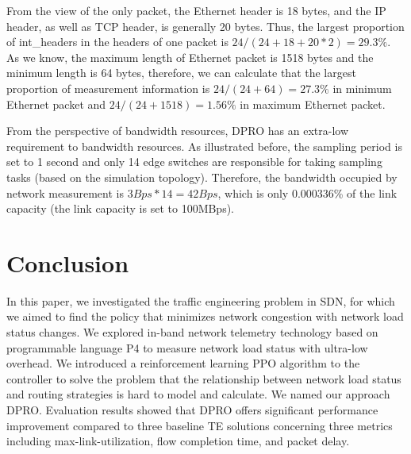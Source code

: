 \documentclass[10pt,conference]{IEEEtran}
\begin{document}
From the view of the only packet, the Ethernet header is 18 bytes, and the IP header, as well as TCP header, is generally 20 bytes. Thus, the largest proportion of int\_headers in the headers of one packet is $24/(24+18+20*2)=29.3\%$. As we know, the maximum length of Ethernet packet is 1518 bytes and the minimum length is 64 bytes, therefore, we can calculate that the largest proportion of measurement information is $24/(24+64)=27.3\%$ in minimum Ethernet packet and $24/(24+1518)=1.56\%$ in maximum Ethernet packet.

From the perspective of bandwidth resources, DPRO has an extra-low requirement to bandwidth resources. As illustrated before, the sampling period is set to 1 second and only 14 edge switches are responsible for taking sampling tasks (based on the simulation topology). Therefore, the bandwidth occupied by network measurement is $3Bps *14=42Bps$, which is only 0.000336\% of the link capacity (the link capacity is set to 100MBps).

\section{Conclusion}
In this paper, we investigated the traffic engineering problem in SDN, for which we aimed to find the policy that minimizes network congestion with network load status changes. We explored in-band network telemetry technology based on programmable language P4 to measure network load status with ultra-low overhead. We introduced a reinforcement learning PPO algorithm to the controller to solve the problem that the relationship between network load status and routing strategies is hard to model and calculate. We named our approach DPRO. Evaluation results showed that DPRO offers significant performance improvement compared to three baseline TE solutions concerning three metrics including max-link-utilization, flow completion time, and packet delay.



\vspace{12pt}
\end{document}
